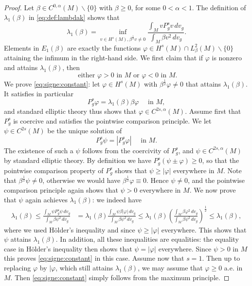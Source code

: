 \documentclass[10pt]{amsart}
\numberwithin{equation}{section}
\newcommand{\vp}{\varphi}
\theoremstyle{plain}
\theoremstyle{remark}
\begin{document}
\begin{proof}
Let $\beta \in C^{0,\alpha}(M) \backslash \{0\}$ with $\beta \ge 0$, for some $0 < \alpha < 1$. The definition of $\lambda_1(\beta)$ in  \eqref{eq:def:lambdak} shows that 
$$ \lambda_1(\beta)  = \inf_{v \in H^s(M), \beta^{\frac12} v \neq 0} \frac{\int_M v P_g^sv \, dv_g}{\int_M \beta v^2 \, dv_g}. $$ 
Elements in $E_1(\beta)$ are exactly the functions $\vp \in H^s(M) \cap L^2_{\beta}(M) \backslash \{0\}$ attaining the infimum in the right-hand side. We first claim that if $\vp$ is nonzero and attains $\lambda_1(\beta)$, then
\begin{equation} \label{eq:signe:constant}
 \text{ either } \vp >0 \text{ in } M \text{ or } \vp < 0 \text{ in } M. 
\end{equation}
We prove \eqref{eq:signe:constant}: let $ \vp \in H^s(M)$ with $\beta^{\frac12} \vp \neq 0$ that attains $\lambda_1(\beta)$. It satisfies in particular 
$$ P_g^s \vp = \lambda_1(\beta) \beta \vp \quad \text{ in } M, $$
and standard elliptic theory thus shows that $\vp \in C^{2s,\alpha}(M)$. Assume first that $P_g^s$ is coercive and satisfies the pointwise comparison principle. We let $\psi \in C^{2s}(M)$ be the unique solution of 
$$ P_g^s \psi = |P_g^s \vp| \quad \text{ in } M. $$
The existence of such a $\psi$ follows from the coercivity of $P_g^s$, and $\psi \in C^{2s,\alpha}(M)$ by standard elliptic theory. By definition we have $P_g^s(\psi \pm \vp) \ge 0$, so that the pointwise comparison property of $P_g^s$ shows that $\psi \ge |\vp|$ everywhere in $M$. Note that  $\beta^{\frac12} \psi \neq 0$, otherwise we would  have $\beta^{\frac12} \vp \equiv 0$. Hence $\psi \neq 0$, and the pointwise comparison principle again shows that $\psi >0$ everywhere in $M$. We now prove that $\psi$ again achieves $\lambda_1(\beta)$: we indeed have 
$$ \begin{aligned}
\lambda_1(\beta) \le \frac{\int_M \psi P_g^s \psi \, dv_g}{\int_M \beta \psi^2 \, dv_g} & = \lambda_1(\beta) \frac{ \int_M \psi  \beta | \vp|  \, dv_g}{\int_M \beta \psi^2 \, dv_g}  \le \lambda_1(\beta) \left( \frac{ \int_M \beta \vp^2 \, dv_g}{\int_M \beta \psi^2 \, dv_g} \right)^{\frac12}  \le \lambda_1(\beta),
\end{aligned} $$ 
where we used H\"older's inequality and since $\psi \ge |\vp|$ everywhere. This shows that $\psi$ attains $\lambda_1(\beta)$. In addition, all these inequalities are equalities: the equality case in H\"older's inequality then shows that $\psi = |\vp|$ everywhere. Since $\psi >0$ in $M$ this proves \eqref{eq:signe:constant} in this case. Assume now that $s=1$. Then up to replacing $\vp$ by $|\vp$, which still attains $\lambda_1(\beta)$, we may assume that $\vp \ge0$ a.e. in $M$. Then \eqref{eq:signe:constant} simply follows from the maximum principle. 


\end{proof}
\end{document}

